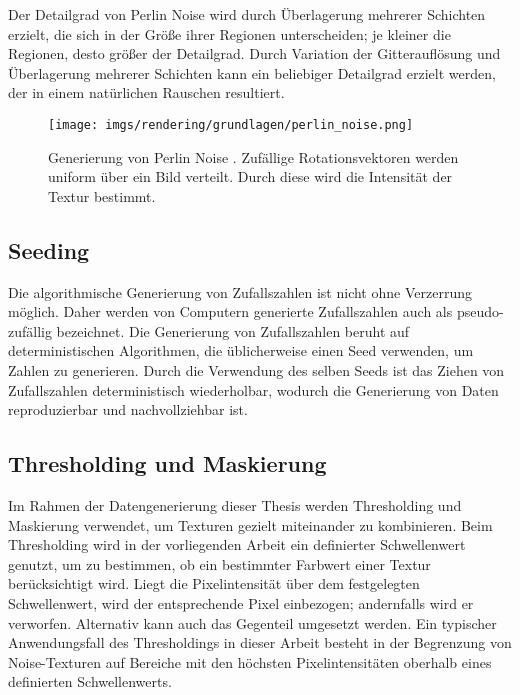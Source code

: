 Der Detailgrad von Perlin Noise wird durch Überlagerung mehrerer Schichten erzielt, die sich in der Größe ihrer Regionen unterscheiden; je kleiner die Regionen, desto größer der Detailgrad. Durch Variation der Gitterauflösung und Überlagerung mehrerer Schichten kann ein beliebiger Detailgrad erzielt werden, der in einem natürlichen Rauschen resultiert.

\begin{figure}
    \centering
    \texttt{[image: imgs/rendering/grundlagen/perlin\_noise.png]}
    \caption{Generierung von Perlin Noise \cite{perlin_noise_img}. Zufällige Rotationsvektoren werden uniform über ein Bild verteilt. Durch diese wird die Intensität der Textur bestimmt.}
    \label{img:perlin_noise_generation}
\end{figure}

\subsection{Seeding}
\label{sec:seeding}

Die algorithmische Generierung von Zufallszahlen ist nicht ohne Verzerrung möglich. Daher werden von Computern generierte Zufallszahlen auch als pseudo-zufällig bezeichnet. Die Generierung von Zufallszahlen beruht auf deterministischen Algorithmen, die üblicherweise einen Seed verwenden, um Zahlen zu generieren. Durch die Verwendung des selben Seeds ist das Ziehen von Zufallszahlen deterministisch wiederholbar, wodurch die Generierung von Daten reproduzierbar und nachvollziehbar ist.

\subsection{Thresholding und Maskierung}
\label{sec:thresholding_maskierung}

Im Rahmen der Datengenerierung dieser Thesis werden Thresholding und Maskierung verwendet, um Texturen gezielt miteinander zu kombinieren. Beim Thresholding wird in der vorliegenden Arbeit ein definierter Schwellenwert genutzt, um zu bestimmen, ob ein bestimmter Farbwert einer Textur berücksichtigt wird. Liegt die Pixelintensität über dem festgelegten Schwellenwert, wird der entsprechende Pixel einbezogen; andernfalls wird er verworfen. Alternativ kann auch das Gegenteil umgesetzt werden. Ein typischer Anwendungsfall des Thresholdings in dieser Arbeit besteht in der Begrenzung von Noise-Texturen auf Bereiche mit den höchsten Pixelintensitäten oberhalb eines definierten Schwellenwerts.


